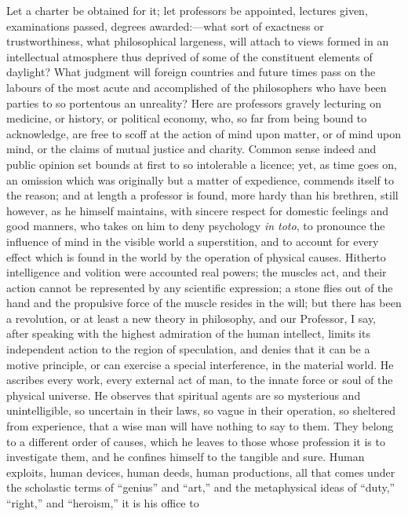 Let a charter be obtained for it; let professors be appointed,
lectures given, examinations passed, degrees awarded:—what sort of
exactness or trustworthiness, what philosophical largeness, will
attach to views formed in an intellectual atmosphere thus deprived of
some of the constituent elements of daylight? What judgment will
foreign countries and future times pass on the labours of the most
acute and accomplished of the philosophers who have been parties to so
portentous an unreality? Here are professors gravely lecturing on
medicine, or history, or political economy, who, so far from
being bound to acknowledge, are free to scoff at the action of mind
upon matter, or of mind upon mind, or the claims of mutual justice and
charity. Common sense indeed and public opinion set bounds at first to
so intolerable a licence; yet, as time goes on, an omission which was
originally but a matter of expedience, commends itself to the reason;
and at length a professor is found, more hardy than his brethren,
still however, as he himself maintains, with sincere respect for
domestic feelings and good manners, who takes on him to deny
psychology \emph{in toto}, to pronounce the influence of mind in the
visible world a superstition, and to account for every effect which is
found in the world by the operation of physical causes. Hitherto
intelligence and volition were accounted real powers; the muscles act,
and their action cannot be represented by any scientific expression; a
stone flies out of the hand and the propulsive force of the muscle
resides in the will; but there has been a revolution, or at least a
new theory in philosophy, and our Professor, I say, after speaking
with the highest admiration of the human intellect, limits its
independent action to the region of speculation, and denies that it
can be a motive principle, or can exercise a special interference, in
the material world. He ascribes every work, every external act of man,
to the innate force or soul of the physical universe. He observes that
spiritual agents are so mysterious and unintelligible, so uncertain in
their laws, so vague in their operation, so sheltered from experience,
that a wise man will have nothing to say to them. They belong to a
different order of causes, which he leaves to those whose profession
it is to investigate them, and he confines himself to the tangible and
sure. Human exploits, human devices, human deeds, human productions,
all that comes under the scholastic terms of ``genius''
and ``art,'' and the metaphysical ideas of ``duty,''
``right,'' and ``heroism,'' it is his office to
